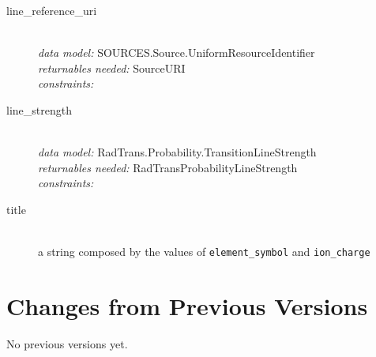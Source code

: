\documentclass[11pt,a4paper]{ivoa}
\begin{document}
\begin{description}
	\item [line\_reference\_uri]\hfill\\
	\textit{data model:} SOURCES.Source.UniformResourceIdentifier\\
	\textit{returnables needed:} SourceURI\\
	\textit{constraints:}

	\item [line\_strength]\hfill\\
	\textit{data model:} RadTrans.Probability.TransitionLineStrength\\
	\textit{returnables needed:} RadTransProbabilityLineStrength\\
        \textit{constraints:}

\item [title]\hfill\\
	a string composed by the values of  \texttt{element\_symbol} and \texttt{ion\_charge}


\end{description}


\appendix
\section{Changes from Previous Versions}

No previous versions yet.



\end{document}

